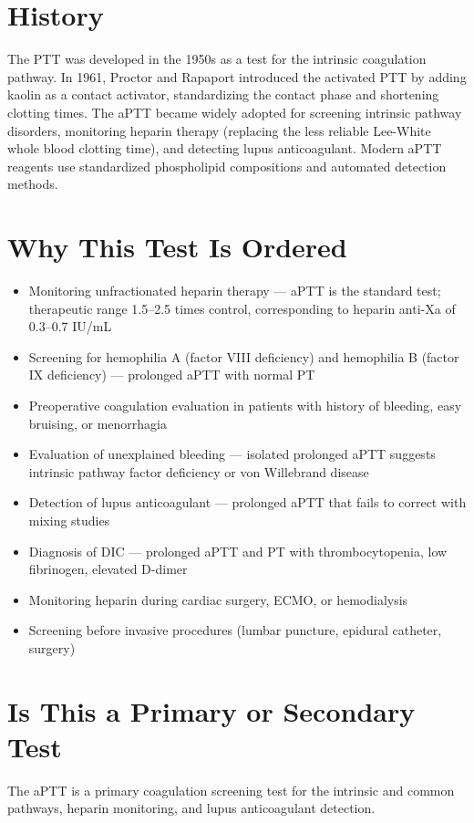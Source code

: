 \section*{History}
The PTT was developed in the 1950s as a test for the intrinsic coagulation pathway. In 1961, Proctor and Rapaport introduced the activated PTT by adding kaolin as a contact activator, standardizing the contact phase and shortening clotting times. The aPTT became widely adopted for screening intrinsic pathway disorders, monitoring heparin therapy (replacing the less reliable Lee-White whole blood clotting time), and detecting lupus anticoagulant. Modern aPTT reagents use standardized phospholipid compositions and automated detection methods.

\section*{Why This Test Is Ordered}
\begin{itemize}
  \item Monitoring unfractionated heparin therapy --- aPTT is the standard test; therapeutic range 1.5--2.5 times control, corresponding to heparin anti-Xa of 0.3--0.7 IU/mL
  \item Screening for hemophilia A (factor VIII deficiency) and hemophilia B (factor IX deficiency) --- prolonged aPTT with normal PT
  \item Preoperative coagulation evaluation in patients with history of bleeding, easy bruising, or menorrhagia
  \item Evaluation of unexplained bleeding --- isolated prolonged aPTT suggests intrinsic pathway factor deficiency or von Willebrand disease
  \item Detection of lupus anticoagulant --- prolonged aPTT that fails to correct with mixing studies
  \item Diagnosis of DIC --- prolonged aPTT and PT with thrombocytopenia, low fibrinogen, elevated D-dimer
  \item Monitoring heparin during cardiac surgery, ECMO, or hemodialysis
  \item Screening before invasive procedures (lumbar puncture, epidural catheter, surgery)
\end{itemize}

\section*{Is This a Primary or Secondary Test}
The aPTT is a primary coagulation screening test for the intrinsic and common pathways, heparin monitoring, and lupus anticoagulant detection.

